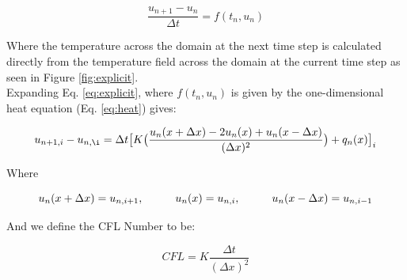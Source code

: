 \documentclass[10pt, letter, showtrims]{extarticle}
\begin{document}
		\begin{equation}
		\label{eq:explicit}
			\frac{u_{n+1} - u_{n}}{\Delta t} = f(t_{n}, u_{n})
		\end{equation}
		
		\vspace{1em}
		
		\noindent
		Where the temperature across the domain at the next time step is calculated directly from the temperature field across the domain at the current time step as seen in Figure \ref{fig:explicit}. \\
		
		\noindent
		Expanding Eq. \ref{eq:explicit}, where $f(t_{n}, u_{n})$ is given by the one-dimensional heat equation (Eq. \ref{eq:heat}) gives:
		
		
		\begin{equation}
			u_{n+1,i} - u_{n,\i} = \Delta t \big[ K \big(\frac{u_{n}(x + \Delta x) - 2 u_{n}(x) + u_{n}(x - \Delta x)}{(\Delta x)^{2}}\big) + q_{n}(x) \big]_{i}
		\end{equation}
		
		\noindent
		Where
		
		\begin{equation}
		\label{eq:delta}
				u_{n}(x + \Delta x) = u_{n,i+1}, \hphantom{xxxxx} u_{n}(x) = u_{n,i}, \hphantom{xxxxx} u_{n}(x - \Delta x) = u_{n,i-1}
		\end{equation}
		
%		
		
		\vspace{1em}
		
		\noindent
		And we define the CFL Number to be:
		
		\begin{equation}
		\label{eq:cfl}
			CFL = K \frac{\Delta t}{(\Delta x)^{2}}
		\end{equation}
		
\end{document}
